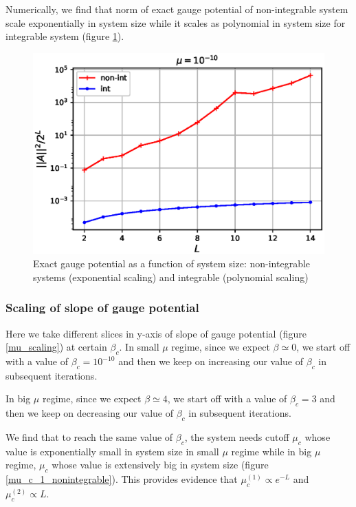 \documentclass[11pt,a4paper]{article}
\begin{document}
Numerically, we find that norm of exact gauge potential of non-integrable system scale exponentially in system size while it scales as polynomial in system size for integrable system (figure \ref{exact_regime}).
\begin{figure}[!ht]
\begin{center}
\includegraphics[scale=0.7]{new_pics/v2_1_norm_L_scaling.eps}
\caption{Exact gauge potential as a function of system size: non-integrable systems (exponential scaling) and integrable (polynomial scaling) }
\label{exact_regime}
\end{center}
\end{figure}


\subsubsection*{Scaling of slope of gauge potential}

Here we take different slices in y-axis of slope of gauge potential (figure \ref{mu_scaling}) at certain $\beta_c$. In small $\mu$ regime, since we expect $\beta \simeq 0$, we start off with a value of $\beta_c=10^{-10}$  and then we keep on  increasing our value of $\beta_c$ in subsequent iterations. 

In big $\mu$ regime, since we expect $\beta \simeq 4$, we start off with a value of $\beta_c=3$ and then we keep on decreasing our value of $\beta_c$ in subsequent iterations. 

We find that to reach the same value of $\beta_c$, the system needs cutoff $\mu_c$ whose value is exponentially small in system size in small $\mu$ regime while in big  $\mu$ regime, $\mu_c$ whose value is extensively big in system size (figure \ref{mu_c_1_nonintegrable}). This provides evidence that $\mu_c^{(1)} \propto e^{-L}$ and $\mu_c^{(2)} \propto L$.
\end{document}
